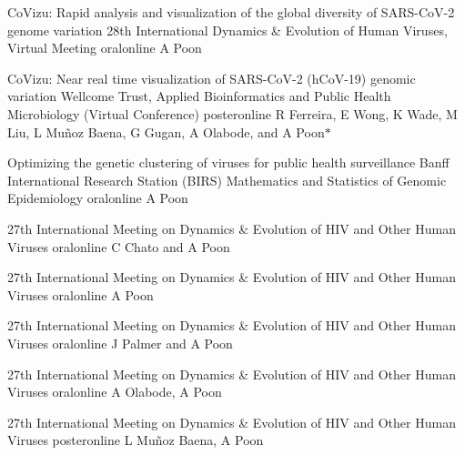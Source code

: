 {CoVizu: Rapid analysis and visualization of the global diversity of SARS-CoV-2 genome variation}
{28th International Dynamics \& Evolution of Human Viruses, Virtual Meeting}
{oral}{online}
{A Poon}{}

{CoVizu: Near real time visualization of SARS-CoV-2 (hCoV-19) genomic variation}
{Wellcome Trust, Applied Bioinformatics and Public Health Microbiology (Virtual Conference)}
{poster}{online}
{R Ferreira, E Wong, K Wade, M Liu, L Mu\~noz Baena, G Gugan, A Olabode, and A Poon$\ast$}{}

{Optimizing the genetic clustering of viruses for public health surveillance}
{Banff International Research Station (BIRS) Mathematics and Statistics of Genomic Epidemiology}
{oral}{online}
{A Poon}{}

{27th International Meeting on Dynamics \& Evolution of HIV and Other Human Viruses}
{oral}{online}
{C Chato and A Poon}{}

{27th International Meeting on Dynamics \& Evolution of HIV and Other Human Viruses}
{oral}{online}
{A Poon}{}

{27th International Meeting on Dynamics \& Evolution of HIV and Other Human Viruses}
{oral}{online}
{J Palmer and A Poon}{}

{27th International Meeting on Dynamics \& Evolution of HIV and Other Human Viruses}
{oral}{online}
{A Olabode, A Poon}{}

{27th International Meeting on Dynamics \& Evolution of HIV and Other Human Viruses}
{poster}{online}
{L Mu\~noz Baena, A Poon}{}



